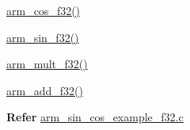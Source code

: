 \begin{DoxyParagraph}{}

\begin{DoxyItemize}
\item \hyperlink{group__cos_gace15287f9c64b9b4084d1c797d4c49d8}{arm\-\_\-cos\-\_\-f32()}
\item \hyperlink{group__sin_gae164899c4a3fc0e946dc5d55555fe541}{arm\-\_\-sin\-\_\-f32()}
\item \hyperlink{group___basic_mult_gaca3f0b8227da431ab29225b88888aa32}{arm\-\_\-mult\-\_\-f32()}
\item \hyperlink{group___basic_add_ga6a904a547413b10565dd1d251c6bafbd}{arm\-\_\-add\-\_\-f32()}
\end{DoxyItemize}
\end{DoxyParagraph}
{\bfseries  Refer } \hyperlink{arm_sin_cos_example_f32_8c-example}{arm\-\_\-sin\-\_\-cos\-\_\-example\-\_\-f32.\-c} 